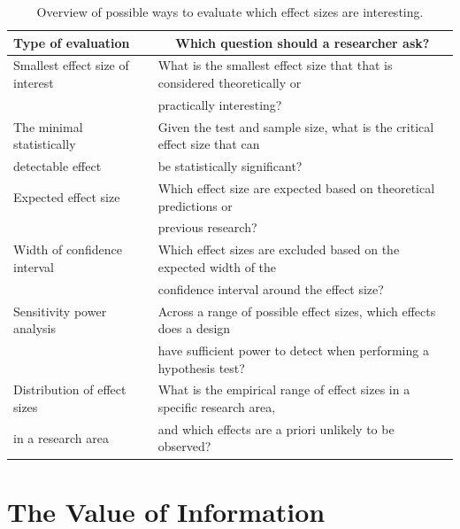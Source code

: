 \documentclass[
  english,
  ,jou, a4paper,floatsintext]{apa6}
\begin{document}
\begin{table}[tbp]

\begin{center}
\begin{threeparttable}

\caption{\label{tab:table-effect-eval}Overview of possible ways to evaluate which effect sizes are interesting.}

\begin{tabular}{ll}
\toprule
Type of evaluation & \multicolumn{1}{c}{Which question should a researcher ask?}\\
\midrule
Smallest effect size of interest & What is the smallest effect size that that is considered theoretically or\\
 & practically interesting?\\ \midrule
The minimal statistically & Given the test and sample size, what is the critical effect size that can\\
detectable effect & be statistically significant?\\ \midrule
Expected effect size & Which effect size are expected based on theoretical predictions or\\
 & previous research?\\ \midrule
Width of confidence interval & Which effect sizes are excluded based on the expected width of the\\
 & confidence interval around the effect size?\\ \midrule
Sensitivity power analysis & Across a range of possible effect sizes, which effects does a design\\
 & have sufficient power to detect when performing a hypothesis test?\\ \midrule
Distribution of effect sizes & What is the empirical range of effect sizes in a specific research area,\\
in a research area & and which effects are a priori unlikely to be observed?\\
\bottomrule
\end{tabular}

\end{threeparttable}
\end{center}

\end{table}

\hypertarget{the-value-of-information}{%
\section{The Value of Information}\label{the-value-of-information}}
\end{document}
